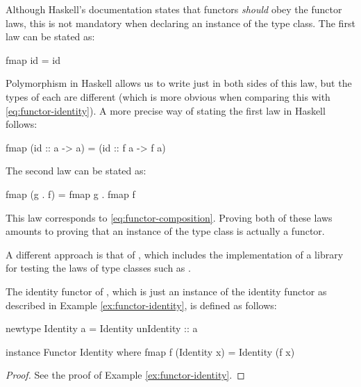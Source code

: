 Although Haskell's documentation states that functors \emph{should}
obey the functor laws, this is not mandatory when declaring an
instance of the  type class. The first law can be
stated as:
\begin{codehaskell}
fmap id = id
\end{codehaskell}
Polymorphism in Haskell allows us to write just  in
both sides of this law, but the types of each  are
different (which is more obvious when comparing this with
\eqref{eq:functor-identity}). A more precise way of stating the first
law in Haskell follows:
\begin{codehaskell}
fmap (id :: a -> a) = (id :: f a -> f a)
\end{codehaskell}
The second law can be stated as:
\begin{codehaskell}
fmap (g . f) = fmap g . fmap f
\end{codehaskell}
This law corresponds to \eqref{eq:functor-composition}. Proving both
of these laws amounts to proving that an instance of the
 type class is actually a functor.

\begin{remark}

  A different approach is that of \parencite{jeuring-2012}, which
  includes the implementation of a library for testing the laws of
  type classes such as .

\end{remark}

\begin{example}
  \label{ex:functor-identity-haskell}

  The identity functor of \hask, which is just an instance of the
  identity functor as described in Example \ref{ex:functor-identity},
  is defined as follows:
  \begin{codehaskell}
newtype Identity a = Identity {unIdentity :: a}

instance Functor Identity where
  fmap f (Identity x) = Identity (f x)
  \end{codehaskell}


  \begin{proof}

    See the proof of Example \ref{ex:functor-identity}.

  \end{proof}

\end{example}

